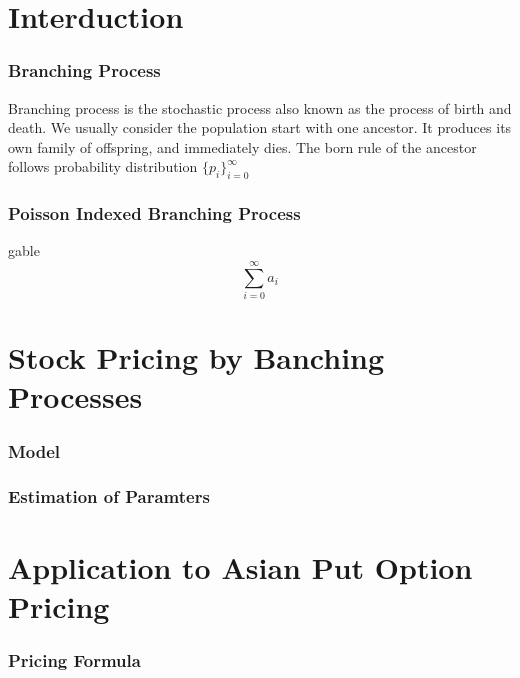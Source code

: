 \chapter{Interduction}



\subsection{Branching Process}
Branching process is the stochastic process also known as the process of birth and death. We usually consider the population start with one ancestor. It produces its own family
of offspring, and immediately dies. The born rule of the ancestor follows probability distribution $\{p_i\}_{i=0}^\infty$ 



\subsection{Poisson Indexed Branching Process}
gable
$$\sum_{i=0}^{\infty}a_i$$

\chapter{Stock Pricing by Banching Processes}
\subsection{Model}

\subsection{Estimation of Paramters}
\chapter{Application to Asian Put Option Pricing}

\subsection{Pricing Formula}